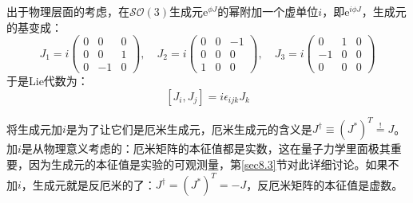 出于物理层面的考虑，在$\mathcal{SO}(3)$生成元$\mathrm{e}^{\phi J}$的幂附加一个虚单位$i$，即$\mathrm{e}^{i\phi J}$，生成元的基变成：
\begin{equation}
\label{equ3.72}
J_1 = i
	\begin{pmatrix}
		0 & 0 & 0 \\
		0 & 0 & 1 \\
		0 & -1 & 0
	\end{pmatrix}
,\quad
J_2 = i
	\begin{pmatrix}
		0 & 0 & -1 \\
		0 & 0 & 0 \\
		1 & 0 & 0
	\end{pmatrix}
,\quad
J_3 = i
	\begin{pmatrix}
		0 & 1 & 0 \\
		-1 & 0 & 0 \\
		0 & 0 & 0
	\end{pmatrix}
\end{equation}
于是Lie代数为：
\begin{equation}
\label{equ3.73}
[J_i, J_j] = i\epsilon_{ijk} J_k
\end{equation}

将生成元加$i$是为了让它们是厄米生成元，厄米生成元的含义是$J^\dag \equiv (J^*)^T \stackrel{!}{=} J$。加$i$是从物理意义考虑的：厄米矩阵的本征值都是实数，这在量子力学里面极其重要，因为生成元的本征值是实验的可观测量，第\ref{sec8.3}节对此详细讨论。如果不加$i$，生成元就是反厄米的了：$J^\dag = (J^*)^T = -J$，反厄米矩阵的本征值是虚数。

